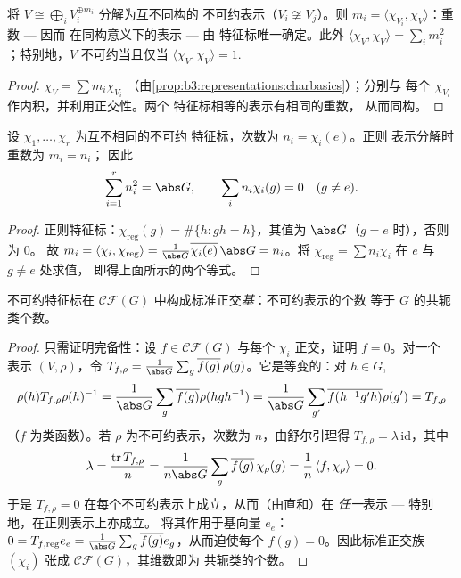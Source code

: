 \begin{corollary}\label{cor:b3:representations:multiplicity}
将 $V \cong \bigoplus_i V_i^{\oplus m_i}$ 分解为互不同构的
不可约表示（$V_i \not\cong V_j$）。则 $m_i = \langle
\chi_{V_i}, \chi_V\rangle$：重数 --- 因而
在同构意义下的表示 --- 由
特征标唯一确定。此外 $\langle \chi_V, \chi_V\rangle = \sum_i
m_i^2$；特别地，$V$ 不可约当且仅当 $\langle\chi_V,
\chi_V\rangle = 1$.
\end{corollary}

\begin{proof}
$\chi_V = \sum m_i\chi_{V_i}$
（由\cref{prop:b3:representations:charbasics}）；分别与
每个 $\chi_{V_i}$ 作内积，并利用正交性。两个
特征标相等的表示有相同的重数，
从而同构。
\end{proof}

\begin{theorem}[正则表示]
\label{thm:b3:representations:regular}
设 $\chi_1, \dots, \chi_r$ 为互不相同的不可约
特征标，次数为 $n_i = \chi_i(e)$。正则
表示分解时重数为 $m_i = n_i$；
因此
\[
\sum_{i=1}^{r} n_i^2 = \abs G,
\qquad
\sum_i n_i\chi_i(g) = 0 \quad (g \neq e).
\]
\end{theorem}

\begin{proof}
正则特征标：$\chi_{\mathrm{reg}}(g) =
\#\{h : gh = h\}$，其值为 $\abs G$（$g = e$ 时），否则为 $0$。
故 $m_i = \langle \chi_i,\chi_{\mathrm{reg}}\rangle =
\frac1{\abs G}\overline{\chi_i(e)}\,\abs G = n_i$。将
$\chi_{\mathrm{reg}} = \sum n_i\chi_i$ 在 $e$ 与 $g \neq e$ 处求值，
即得上面所示的两个等式。
\end{proof}

\begin{theorem}\label{thm:b3:representations:numberirr}
不可约特征标在
$\mathcal{CF}(G)$ 中构成标准正交\emph{基}：不可约表示的个数
等于 $G$ 的共轭类个数。
\end{theorem}

\begin{proof}
只需证明完备性：设 $f \in \mathcal{CF}(G)$
与每个 $\chi_i$ 正交，证明 $f = 0$。对一个
表示 $(V,\rho)$，令 $T_{f,\rho} = \frac{1}{\abs G}
\sum_g \overline{f(g)}\,\rho(g)$。它是等变的：对 $h \in
G$,
\[
\rho(h)T_{f,\rho}\rho(h)^{-1} = \frac1{\abs G}\sum_g
\overline{f(g)}\rho(hgh^{-1})
= \frac1{\abs G}\sum_{g'}\overline{f(h^{-1}g'h)}\rho(g') =
T_{f,\rho}
\]
（$f$ 为类函数）。若 $\rho$ 为不可约表示，次数为
$n$，由舒尔引理得 $T_{f,\rho} = \lambda\,\mathrm{id}$，其中
\[
\lambda = \frac{\operatorname{tr}T_{f,\rho}}{n}
= \frac{1}{n\abs G}\sum_g \overline{f(g)}\,\chi_\rho(g)
= \frac1n\,\langle f, \chi_\rho\rangle = 0 .
\]
于是 $T_{f,\rho} = 0$ 在每个不可约表示上成立，从而（由直和）在
\emph{任一}表示 --- 特别地，在正则表示上亦成立。
将其作用于基向量 $e_e$：$0 = T_{f,\mathrm{reg}}e_e =
\frac1{\abs G}\sum_g\overline{f(g)}e_g$，从而迫使每个
$\overline{f(g)} = 0$。因此标准正交族
$(\chi_i)$ 张成 $\mathcal{CF}(G)$，其维数即为
共轭类的个数。
\end{proof}


